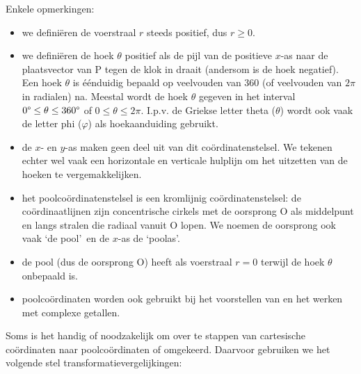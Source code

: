 Enkele opmerkingen:
\begin{itemize}
\item we defini\"eren de voerstraal $r$ steeds positief, dus $r\geq0$.
\item we defini\"eren de hoek $\theta$ positief als de pijl van de positieve
$x$-as naar de plaatsvector van P tegen de klok in draait (andersom
is de hoek negatief). Een hoek $\theta$ is \'e\'enduidig bepaald op veelvouden
van 360\textdegree{} (of veelvouden van $2\pi$ in radialen) na. Meestal
wordt de hoek $\theta$ gegeven in het interval $0\text{\textdegree}\leq\theta\leq360\text{\textdegree}$
of $0\leq\theta\leq2\pi$. I.p.v. de Griekse letter theta ($\theta$) wordt ook vaak de letter phi ($\varphi$) als hoekaanduiding gebruikt.
\item de $x$- en $y$-as maken geen deel uit van dit co\"ordinatenstelsel. We tekenen
echter wel vaak een horizontale en verticale hulplijn om het uitzetten
van de hoeken te vergemakkelijken.
\item het poolco\"ordinatenstelsel is een kromlijnig co\"ordinatenstelsel: de
co\"ordinaatlijnen zijn concentrische cirkels met de oorsprong O als
middelpunt en langs stralen die radiaal vanuit O lopen. We noemen
de oorsprong ook vaak \textquoteleft de pool\textquoteright\ en de $x$-as de \textquoteleft poolas\textquoteright.
\item de pool (dus de oorsprong O) heeft als voerstraal $r=0$ terwijl de
hoek $\theta$ onbepaald is.
\item poolco\"ordinaten worden ook gebruikt bij het voorstellen van en het
werken met complexe getallen.
\end{itemize}

Soms is het handig of noodzakelijk om over te stappen van
cartesische co\"ordinaten naar poolco\"ordinaten of omgekeerd. Daarvoor
gebruiken we het volgende stel transformatievergelijkingen:

\vspace{1cm}

